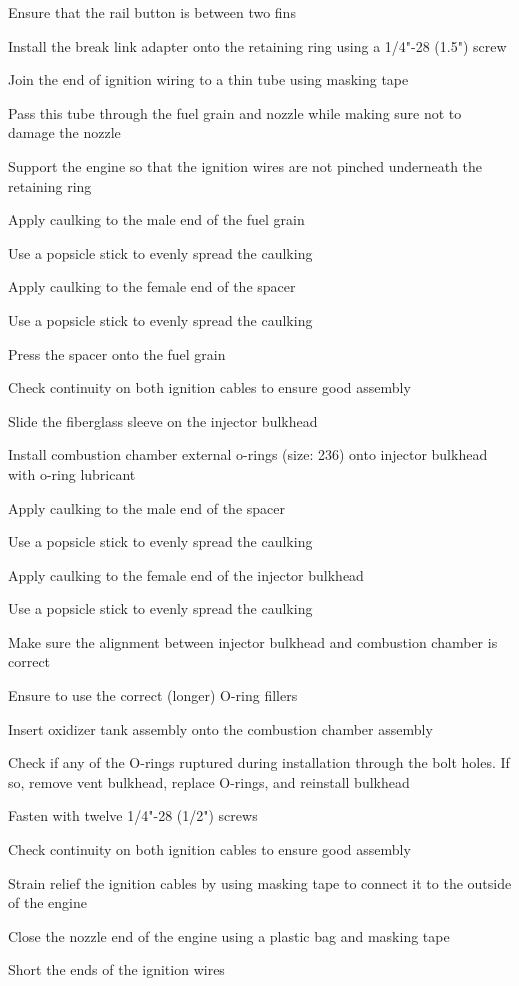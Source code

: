 \begin{checklist}
        \item Ensure that the rail button is between two fins
        \item Install the break link adapter onto the retaining ring using a 1/4"-28 (1.5") screw
        \item Join the end of ignition wiring to a thin tube using masking tape
        \item Pass this tube through the fuel grain and nozzle while making sure not to damage the nozzle
        \item Support the engine so that the ignition wires are not pinched underneath the retaining ring
        \item Apply caulking to the male end of the fuel grain
        \item Use a popsicle stick to evenly spread the caulking
        \item Apply caulking to the female end of the spacer
        \item Use a popsicle stick to evenly spread the caulking
        \item Press the spacer onto the fuel grain
        \item Check continuity on both ignition cables to ensure good assembly
        \item Slide the fiberglass sleeve on the injector bulkhead
        \item Install combustion chamber external o-rings (size: 236) onto injector bulkhead with o-ring lubricant
        \item Apply caulking to the male end of the spacer
        \item Use a popsicle stick to evenly spread the caulking
        \item Apply caulking to the female end of the injector bulkhead
        \item Use a popsicle stick to evenly spread the caulking
        \item Make sure the alignment between injector bulkhead and combustion chamber is correct
        \item Ensure to use the correct (longer) O-ring fillers
        \item Insert oxidizer tank assembly onto the combustion chamber assembly
        \item Check if any of the O-rings ruptured during installation through the bolt holes. If so, remove vent bulkhead, replace O-rings, and reinstall bulkhead 
        \item Fasten with twelve 1/4"-28 (1/2") screws
        \item Check continuity on both ignition cables to ensure good assembly
        \item Strain relief the ignition cables by using masking tape to connect it to the outside of the engine
        \item Close the nozzle end of the engine using a plastic bag and masking tape
        \item Short the ends of the ignition wires
    \end{checklist} %

